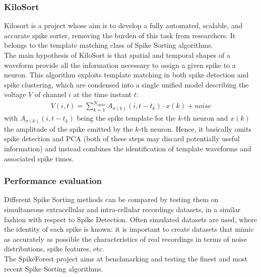 \subsubsection{KiloSort}
Kilosort is a project whose aim is to develop a fully automated, scalable, and accurate spike sorter, removing the burden of this task from researchers. It belongs to the template
matching class of Spike Sorting algorithms.\\
The main hypothesis of KiloSort is that spatial and temporal shapes of a waveform provide all the information necessary to assign a given spike to a neuron. This algorithm exploits template matching in both spike detection and spike clustering, which are condensed into a single unified model describing the voltage \(V\) of channel \(i\) at the time instant \(t\):
\begin{align*}
    V(i,t)=\sum_{k=1}^{N_{spike}}A_{\sigma(k)}(i,t-t_k)\cdot x(k) + noise
\end{align*}
with \(A_{\sigma(k)}(i,t-t_k)\) being the spike template for the \(k\)-th neuron
and \(x(k)\) the amplitude of the spike emitted by the \(k\)-th neuron. Hence, it basically omits spike detection and PCA (both of these steps may discard potentially useful information) and instead combines the identification of template waveforms and associated spike times.
\subsubsection{Performance evaluation}
Different Spike Sorting methods can be compared by testing them on simultaneous
extracellular and intra-cellular recordings datasets, in a similar fashion with respect to
Spike Detection. Often simulated datasets are used, where the identity of each spike is known: it is important to create datasets that mimic as accurately as possible the characteristics of real recordings in terms of noise distributions, spike features, etc.\\
The SpikeForest project aims at benchmarking and testing the finest and most recent Spike Sorting algorithms.

